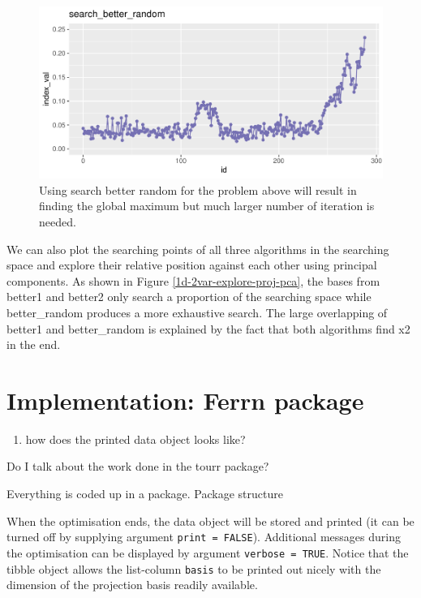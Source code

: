 \documentclass[12pt]{article}
\providecommand{\tightlist}{%
  \setlength{\itemsep}{0pt}\setlength{\parskip}{0pt}}
\begin{document}
\begin{figure}
\centering
\includegraphics{paper_files/figure-latex/1d-2var-better-random-1.pdf}
\caption{\label{1d-2var-better-random}Using search better random for the
problem above will result in finding the global maximum but much larger
number of iteration is needed.}
\end{figure}

We can also plot the searching points of all three algorithms in the
searching space and explore their relative position against each other
using principal components. As shown in Figure
\ref{1d-2var-explore-proj-pca}, the bases from better1 and better2 only
search a proportion of the searching space while better\_random produces
a more exhaustive search. The large overlapping of better1 and
better\_random is explained by the fact that both algorithms find x2 in
the end.

\hypertarget{implementation}{%
\section{Implementation: Ferrn package}\label{implementation}}

\begin{enumerate}
\def\labelenumi{\arabic{enumi}.}
\tightlist
\item
  how does the printed data object looks like?
\end{enumerate}

Do I talk about the work done in the tourr package?

Everything is coded up in a package. Package structure

When the optimisation ends, the data object will be stored and printed
(it can be turned off by supplying argument \texttt{print\ =\ FALSE}).
Additional messages during the optimisation can be displayed by argument
\texttt{verbose\ =\ TRUE}. Notice that the tibble object allows the
list-column \texttt{basis} to be printed out nicely with the dimension
of the projection basis readily available.
\end{document}
